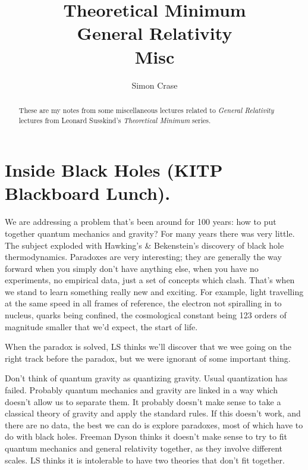 \documentclass[]{article}
\title{Theoretical Minimum\\General Relativity\\Misc}
\author{Simon Crase}
\begin{document}
	
	\maketitle
	
\begin{abstract}
	These are my notes from some miscellaneous lectures related to  \emph{General Relativity}\cite{susskind2012general} lectures from Leonard Susskind's \emph{Theoretical Minimum} series\cite{susskind2007theoretical}.
\end{abstract}
	
\tableofcontents
\listoffigures
\listoftables
\listoftheorems

\section{Inside Black Holes (KITP Blackboard Lunch).}\label{sec:inh}

We are addressing a problem that's been around for 100 years: how to put together quantum mechanics and gravity?  For many years there was very little. The subject exploded with Hawking's \& Bekenstein's discovery of black hole thermodynamics. Paradoxes are very interesting; they are generally the way forward when you simply don't have anything else, when you have no experiments, no empirical data, just a set of concepts which clash. That's when we stand to learn something really new and exciting. For example, light travelling at the same speed in all frames of reference, the electron not spiralling in to nucleus, quarks being confined, the cosmological constant being 123 orders of magnitude smaller that we'd expect, the start of life.\cite{susskind2013inside}

When the paradox is solved, LS thinks we'll discover that we wee going on the right track before the paradox, but we were ignorant of some important thing.

Don't think of quantum gravity as quantizing gravity. Usual quantization has failed. Probably quantum mechanics and gravity are linked in a way which doesn't allow us to separate them. It probably doesn't make sense to take a classical theory of gravity and apply the standard rules. If this doesn't work, and there are no data, the best we can do is explore paradoxes, most of which have to do with black holes. Freeman Dyson thinks it doesn't make sense to try to fit quantum mechanics and general relativity together, as they involve different scales. LS thinks it is intolerable to have two theories that don't fit together. 
\end{document}
